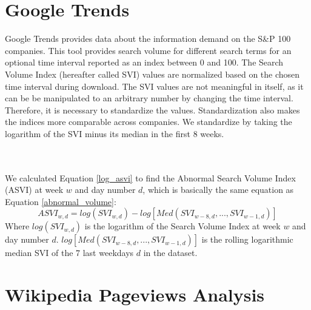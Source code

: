 \section{Google Trends}
Google Trends provides data about the information demand on the S\&P 100 companies. This tool provides search volume for different search terms for an optional time interval reported as an index between 0 and 100. The Search Volume Index (hereafter called SVI) values are normalized based on the chosen time interval during download. The SVI values are not meaningful in itself, as it can be be manipulated to an arbitrary number by changing the time interval. Therefore, it is necessary to standardize the values. Standardization also makes the indices more comparable across companies. We standardize by taking the logarithm of the SVI minus its median in the first 8 weeks. 
\iffalse
We calculated Equation \eqref{asvi} to find the Abnormal Search Volume Index (ASVI), which is the standardized SVI:
\begin{equation}
   \label{eq1} 
   ASVI_t=\frac{SVI_t-\sum_{n=0}^{N}SVI_t_-_n}{\sigma_S_V_I}\
\end{equation}Where N is the number of daily indices during the past year and $\sigma_t$ is the standard deviation of the indices during the past year.
\fi
\\\\
We calculated Equation \eqref{log_asvi} to find the Abnormal Search Volume Index (ASVI) at week $w$ and day number $d$, which is basically the same equation as Equation \eqref{abnormal_volume}:
\begin{equation}
   \label{log_asvi} 
   ASVI_{w,d} = log(SVI_{w,d}) - log[Med(SVI_{w-8,d},...,SVI_{w-1,d})] 
\end{equation}
   Where $log(SVI_{w,d})$ is the logarithm of the Search Volume Index at week $w$ and day number $d$. $log[Med(SVI_{w-8,d},...,SVI_{w-1,d})]$ is the rolling logarithmic median SVI of the 7 last weekdays $d$ in the dataset.

\section{Wikipedia Pageviews Analysis}


